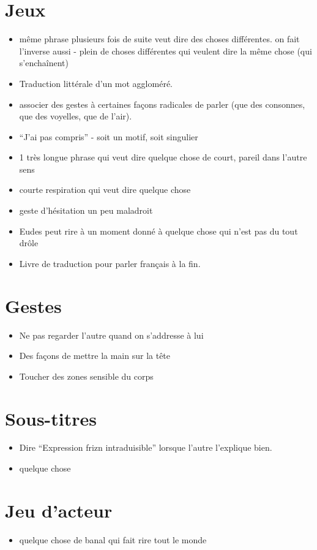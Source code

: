 \documentclass[a4paper]{article}
\begin{document}
\section{Jeux}
\begin{itemize}
\item même phrase plusieurs fois de suite veut dire des choses différentes.
on fait l'inverse aussi - plein de choses différentes qui veulent dire la
même chose (qui s'enchaînent)
\item Traduction littérale d'un mot aggloméré.
\item associer des gestes à certaines façons radicales de parler (que des
consonnes, que des voyelles, que de l'air).
\item ``J'ai pas compris'' - soit un motif, soit singulier
\item 1 très longue phrase qui veut dire quelque chose de court, pareil dans
l'autre sens

\item courte respiration qui veut dire quelque chose
\item geste d'hésitation un peu maladroit

\item Eudes peut rire à un moment donné à quelque chose qui n'est pas du
tout drôle

\item Livre de traduction pour parler français à la fin.

\end{itemize}

\section{Gestes}
\begin{itemize}
\item Ne pas regarder l'autre quand on s'addresse à lui
\item Des façons de mettre la main sur la tête
\item Toucher des zones sensible du corps
\end{itemize}

\section{Sous-titres}
\begin{itemize}
\item Dire ``Expression frizn intraduisible'' lorsque l'autre l'explique
bien.
\item quelque chose 
\end{itemize}

\section{Jeu d'acteur}
\begin{itemize}
\item quelque chose de banal qui fait rire tout le monde
\end{itemize}
\end{document}
